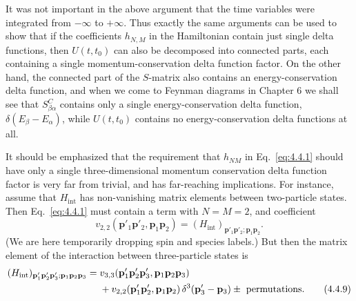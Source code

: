 It was not important in the above argument that the time variables were
integrated from $-\infty$ to $+\infty$. Thus exactly the same arguments can be
used to show that if the coefficients $h_{N,M}$ in the Hamiltonian contain just
single delta functions, then $U(t,t_0)$ can also be decomposed into connected
parts, each containing a single momentum-conservation delta function factor.
On the other hand, the connected part of the $S$-matrix also contains an
energy-conservation delta function, and when we come to Feynman diagrams in
Chapter 6 we shall see that $S^C_{\beta\alpha}$ contains only a single
energy-conservation delta function, $\delta(E_\beta-E_\alpha)$, while
$U(t,t_0)$ contains no energy-conservation delta functions at all.

It should be emphasized that the requirement that $h_{NM}$ in Eq.~\eqref{eq:4.4.1}
should have only a single three-dimensional momentum conservation delta
function factor is very far from trivial, and has far-reaching implications.
For instance, assume that $H_{\mathrm{int}}$ has non-vanishing matrix elements
between two-particle states. Then Eq.~\eqref{eq:4.4.1} must contain a term with $N=M=2$,
and coefficient
\begin{equation}
v_{2,2}(\mathbf{p}'_1\mathbf{p}'_2,
 \mathbf{p}_1\mathbf{p}_2)
=(H_{\mathrm{int}})_{\mathbf{p}'_1\mathbf{p}'_2;
 \mathbf{p}_1\mathbf{p}_2}.
\tag{4.4.8}
\label{eq:4.4.8}
\end{equation}
(We are here temporarily dropping spin and species labels.) But then the matrix
element of the interaction between three-particle states is
\begin{align}
(H_{\mathrm{int}})_{\mathbf{p}'_1\mathbf{p}'_2\mathbf{p}'_3;
 \mathbf{p}_1\mathbf{p}_2\mathbf{p}_3}
={}&v_{3,3}(\mathbf{p}'_1\mathbf{p}'_2\mathbf{p}'_3,
 \mathbf{p}_1\mathbf{p}_2\mathbf{p}_3) \notag\\
&+v_{2,2}(\mathbf{p}'_1\mathbf{p}'_2,
 \mathbf{p}_1\mathbf{p}_2)\,
 \delta^3(\mathbf{p}'_3-\mathbf{p}_3)
 \mathbin{\pm}\text{ permutations}.
\tag{4.4.9}
\label{eq:4.4.9}
\end{align}

